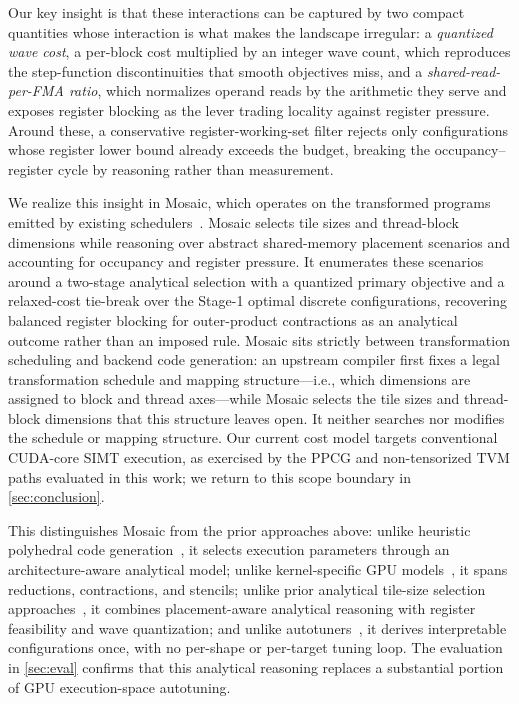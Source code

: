\documentclass[acmsmall,review,anonymous,screen]{acmart}
\newcommand{\name}{{Mosaic}\xspace}
\newcommand{\gpu}{GPU\xspace}
\begin{document}
Our key insight is that these interactions can be captured by two compact quantities whose interaction is what makes the landscape irregular: a \emph{quantized wave cost}, a per-block cost multiplied by an integer wave count, which reproduces the step-function discontinuities that smooth objectives miss, and a \emph{shared-read-per-FMA ratio}, which normalizes operand reads by the arithmetic they serve and exposes register blocking as the lever trading locality against register pressure. Around these, a conservative register-working-set filter rejects only configurations whose register lower bound already exceeds the budget, breaking the occupancy--register cycle by reasoning rather than measurement.

We realize this insight in \name, which operates on the transformed programs emitted by existing schedulers~\cite{ppcg,tvm}. \name selects tile sizes and thread-block dimensions while reasoning over abstract shared-memory placement scenarios and accounting for occupancy and register pressure. It enumerates these scenarios around a two-stage analytical selection with a quantized primary objective and a relaxed-cost tie-break over the Stage-1 optimal discrete configurations, recovering balanced register blocking for outer-product contractions as an analytical outcome rather than an imposed rule. \name sits strictly between transformation scheduling and backend code generation: an upstream compiler first fixes a legal transformation schedule and mapping structure---i.e., which dimensions are assigned to block and thread axes---while \name selects the tile sizes and thread-block dimensions that this structure leaves open. It neither searches nor modifies the schedule or mapping structure. Our current cost model targets conventional CUDA-core SIMT execution, as exercised by the PPCG and non-tensorized TVM paths evaluated in this work; we return to this scope boundary in \autoref{sec:conclusion}.

This distinguishes \name from the prior approaches above: unlike heuristic polyhedral code generation~\cite{ppcg}, it selects execution parameters through an architecture-aware analytical model; unlike kernel-specific \gpu models~\cite{li-gemm,saday-conv,blis}, it spans reductions, contractions, and stencils; unlike prior analytical tile-size selection approaches~\cite{ppcg-tss,eatss,pluto-tss}, it combines placement-aware analytical reasoning with register feasibility and wave quantization; and unlike autotuners~\cite{ansor,metaschedule}, it derives interpretable configurations once, with no per-shape or per-target tuning loop. The evaluation in \autoref{sec:eval} confirms that this analytical reasoning replaces a substantial portion of \gpu execution-space autotuning.
\end{document}
